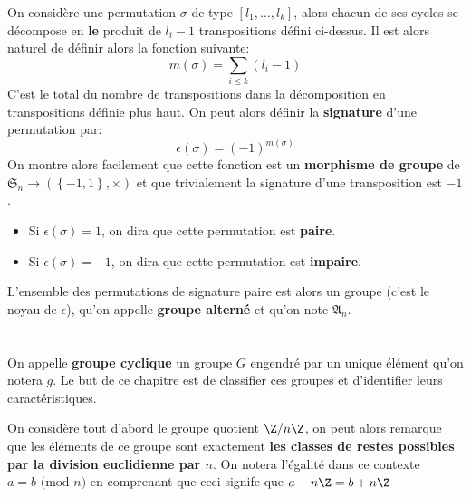 \subsection*{}
On considère une permutation \( \sigma \) de type \( [l_1, \ldots, l_k] \), alors chacun de ses cycles se décompose en \textbf{le} produit de \( l_i-1 \) transpositions défini ci-dessus. Il est alors naturel de définir alors la fonction suivante:
\[ 
   m(\sigma) = \sum_{i \leq k} (l_i-1)
\]
C'est le total du nombre de transpositions dans la décomposition en transpositions définie plus haut. On peut alors définir la \textbf{signature} d'une permutation par:
\[ 
   \epsilon(\sigma) = (-1)^{m(\sigma)} 
\]
On montre alors facilement que cette fonction est un \textbf{morphisme de groupe} de \( \mathfrak{S}_n \longrightarrow ( \left\{ -1 , 1 \right\}, \times ) \) et que trivialement la signature d'une transposition est \( -1 \).
\begin{itemize}
   \item Si \( \epsilon( \sigma) = 1\), on dira que cette permutation est \textbf{paire}.
   \item Si \( \epsilon( \sigma) = -1\), on dira que cette permutation est \textbf{impaire}.
\end{itemize}
L'ensemble des permutations de signature paire est alors un groupe (c'est le noyau de \( \epsilon \)), qu'on appelle \textbf{groupe alterné} et qu'on note \( \mathfrak{A}_n \).
\chapter*{}
On appelle \textbf{groupe cyclique} un groupe \(G\) engendré par un unique élément qu'on notera \(g\). Le but de ce chapitre est de classifier ces groupes et d'identifier leurs caractéristiques.\<
 
On considère tout d'abord le groupe quotient \( \Z /n\Z \), on peut alors remarque que les éléments de ce groupe sont exactement \textbf{les classes de restes possibles par la division euclidienne par \( n \)}. On notera l'égalité dans ce contexte \( a = b \text{ (mod } n) \) en comprenant que ceci signife que \( a + n\Z = b + n\Z \)

